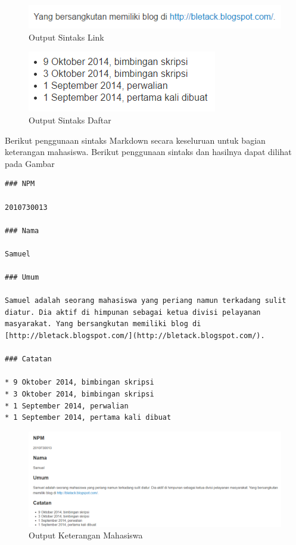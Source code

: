 \begin{figure}[H]
\centering
\includegraphics[scale=1]{Gambar/link.png}
\caption[Output Sintaks Link]{Output Sintaks Link} 
\label{fig:link}
\end{figure}

\begin{figure}[H]
\centering
\includegraphics[scale=1]{Gambar/daftar.png}
\caption[Output Sintaks Daftar]{Output Sintaks Daftar} 
\label{fig:daftar}
\end{figure}

Berikut penggunaan sintaks Markdown secara keseluruan untuk bagian keterangan
mahasiswa. Berikut penggunaan sintaks dan hasilnya dapat dilihat pada Gambar
\begin{lstlisting}
### NPM

2010730013

### Nama

Samuel
			
### Umum
			
Samuel adalah seorang mahasiswa yang periang namun terkadang sulit diatur. Dia aktif di himpunan sebagai ketua divisi pelayanan masyarakat. Yang bersangkutan memiliki blog di [http://bletack.blogspot.com/](http://bletack.blogspot.com/).
			
### Catatan
			
* 9 Oktober 2014, bimbingan skripsi
* 3 Oktober 2014, bimbingan skripsi
* 1 September 2014, perwalian
* 1 September 2014, pertama kali dibuat
\end{lstlisting}

\begin{figure}[H]
\centering
\includegraphics[scale=0.45]{Gambar/overall.png}
\caption[Output Keterangan Mahasiswa]{Output Keterangan Mahasiswa} 
\label{fig:overall}
\end{figure}

